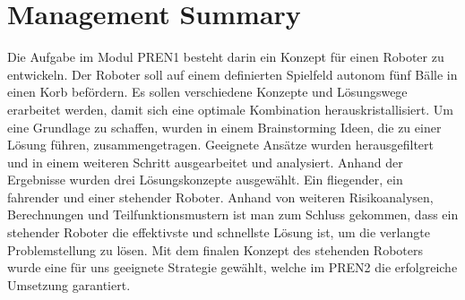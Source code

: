 \section*{Management Summary}
Die Aufgabe im Modul PREN1 besteht darin ein Konzept für einen Roboter zu 
entwickeln. Der Roboter soll auf einem definierten Spielfeld autonom 
fünf Bälle in einen Korb befördern. Es sollen verschiedene Konzepte und 
Lösungswege erarbeitet werden, damit sich eine optimale Kombination herauskristallisiert. 
Um eine Grundlage zu schaffen, wurden in einem Brainstorming Ideen, die zu 
einer Lösung führen, zusammengetragen. Geeignete Ansätze wurden herausgefiltert 
und in einem weiteren Schritt ausgearbeitet und analysiert. Anhand der 
Ergebnisse wurden drei Lösungskonzepte ausgewählt. Ein fliegender, 
ein fahrender und einer stehender Roboter. Anhand von weiteren Risikoanalysen, 
Berechnungen und Teilfunktionsmustern ist man zum Schluss gekommen, dass ein 
stehender Roboter die effektivste und schnellste Lösung ist, um die verlangte 
Problemstellung zu lösen. Mit dem finalen Konzept des stehenden Roboters wurde 
eine für uns geeignete Strategie gewählt, welche im PREN2 die erfolgreiche 
Umsetzung garantiert.
